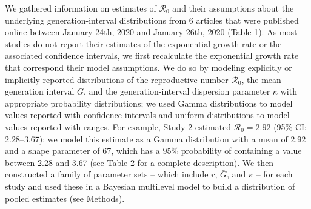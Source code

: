 \documentclass[12pt]{article}
\newcommand{\Rx}[1]{\ensuremath{{\mathcal R}_{#1}}}
\newcommand{\Ro}{\Rx{0}\xspace}
\begin{document}
We gathered information on estimates of \Ro and their assumptions about the underlying generation-interval distributions from 6 articles that were published online between January 24th, 2020 and January 26th, 2020 (Table 1).
As most studies do not report their estimates of the exponential growth rate or the associated confidence intervals, we first recalculate the exponential growth rate that correspond their model assumptions.
We do so by modeling explicitly or implicitly reported distributions of the reproductive number \Ro, the mean generation interval $\bar G$, and the generation-interval dispersion parameter $\kappa$ with appropriate probability distributions;
we used Gamma distributions to model values reported with confidence intervals and uniform distributions to model values reported with ranges.
For example, Study 2 estimated $\Ro = 2.92$ (95\% CI: 2.28--3.67);
we model this estimate as a Gamma distribution with a mean of 2.92 and a shape parameter of 67, which has a 95\% probability of containing a value between 2.28 and 3.67 (see Table 2 for a complete description).
We then constructed a family of parameter sets -- which include $r$, $\bar G$, and $\kappa$ -- for each study and used these in a Bayesian multilevel model to build a distribution of pooled estimates (see Methods).
\end{document}
